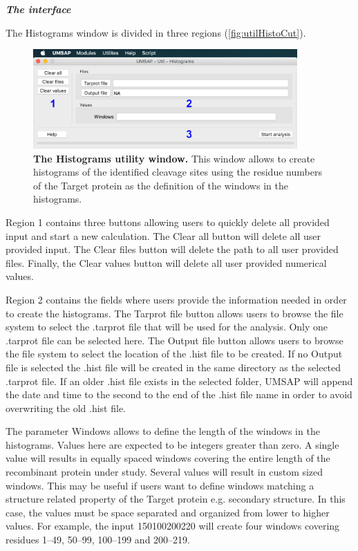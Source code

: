 \textit{\textbf{The interface}}

The Histograms window is divided in three regions (\autoref{fig:utilHistoCut}).

\begin{figure}[h]
	\centering
	\includegraphics[width=0.9\textwidth]{./IMAGES/UTIL-HIST-WINDOW/util-histo.jpg}	    
	\caption[The Histograms utility window]{\textbf{The Histograms utility window.} This window allows to create histograms of the identified cleavage sites using the residue numbers of the Target protein as the definition of the windows in the histograms.} 
	\label{fig:utilHistoCut}
	\vspace{-5pt} 	
\end{figure}

Region \num{1} contains three buttons allowing users to quickly delete all provided input and start a new calculation. The Clear all button will delete all user provided input. The Clear files button will delete the path to all user provided files. Finally, the Clear values button will delete all user provided numerical values.

Region \num{2} contains the fields where users provide the information needed in order to create the histograms. The Tarprot file button allows users to browse the file system to select the .tarprot file that will be used for the analysis. Only one .tarprot file can be selected here. The Output file button allows users to browse the file system to select the location of the .hist file to be created. If no Output file is selected the .hist file will be created in the same directory as the selected .tarprot file. If an older .hist file exists in the selected folder, UMSAP will append the date and time to the second to the end of the .hist file name in order to avoid overwriting the old .hist file. 

The parameter Windows allows to define the length of the windows in the histograms. Values here are expected to be integers greater than zero. A single value will results in equally spaced windows covering the entire length of the recombinant protein under study. Several values will result in custom sized windows. This may be useful if users want to define windows matching a structure related property of the Target protein e.g. secondary structure. In this case, the values must be space separated and organized from lower to higher values. For example, the input \numlist{1 50 100 200 220} will create four windows covering residues \numrange{1}{49}, \numrange{50}{99}, \numrange{100}{199} and \numrange{200}{219}.

